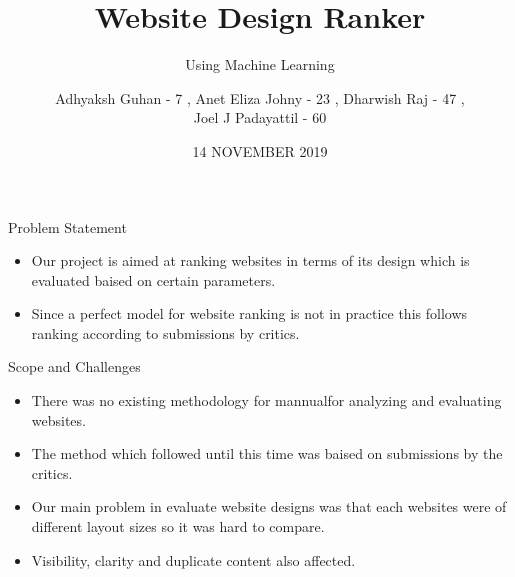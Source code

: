 \documentclass[11pt]{beamer}
\begin{document}
	\title{\textbf{Website Design Ranker}}
	\subtitle{Using Machine Learning}
	\date{14 NOVEMBER 2019}
	\author{{\scriptsize Adhyaksh Guhan - 7 , Anet Eliza Johny - 23 , Dharwish Raj - 47 , \\ Joel J Padayattil - 60}}
	\begin{frame}[plain]
		\maketitle
	\end{frame}
	\begin{frame}{Problem Statement}
		\begin{itemize}
			
			
			\item Our project is aimed at ranking websites in terms of its design which is evaluated baised on certain parameters.
			
			\item Since a perfect model for website ranking  is not in practice this  follows ranking according to submissions by critics.
			
		\end{itemize}
	\end{frame}
	\begin{frame}{Scope and Challenges}
		\begin{itemize}
			
			\item There was no existing methodology for mannualfor analyzing and evaluating websites.
			
			\item The method which followed until this time was baised on submissions by the critics.
			
			\item Our main problem in evaluate website designs was that each websites were of different layout sizes so it was hard to compare.
			
			\item Visibility, clarity and duplicate content also affected.
			
	
			
		\end{itemize}
	\end{frame}
\end{document}
